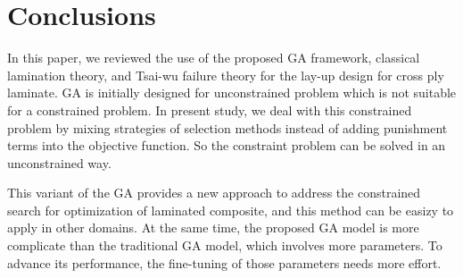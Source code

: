 \section{Conclusions}
In this paper, we reviewed the use of the proposed GA framework, classical
lamination theory, and Tsai-wu failure theory for the lay-up design for cross
ply laminate. GA is initially designed for unconstrained problem which is not
suitable for a constrained problem. In present study, we deal with this
constrained problem by mixing strategies of selection methods instead of adding
punishment terms into the objective function. So the constraint problem can be
solved in an unconstrained way.

This variant of the GA provides a new approach to address the constrained
search for optimization of laminated composite, and this method can be easizy
to apply in other domains. At the same time, the proposed GA model is more
complicate than the traditional GA model, which involves more parameters. To
advance its performance, the fine-tuning of those parameters needs more effort. 
